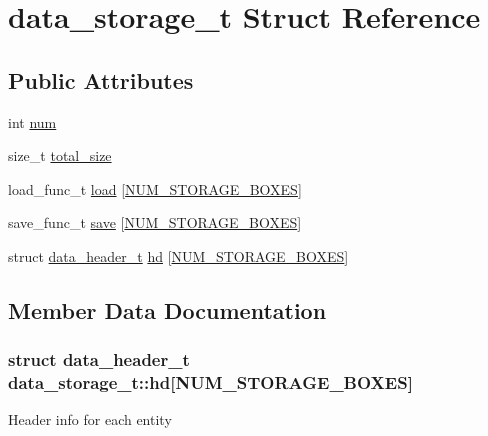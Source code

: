 \hypertarget{structdata__storage__t}{}\section{data\+\_\+storage\+\_\+t Struct Reference}
\label{structdata__storage__t}
\subsection*{Public Attributes}
\begin{DoxyCompactItemize}
\item 
int \hyperlink{structdata__storage__t_ac037eddc51ffd2acc13db6cd92257cc2}{num}
\item 
size\+\_\+t \hyperlink{structdata__storage__t_a0d1c5c0c397a51fff922c8406cff4374}{total\+\_\+size}
\item 
load\+\_\+func\+\_\+t \hyperlink{structdata__storage__t_a99ed11f9a4229d903e7de3eef418fd0a}{load} \mbox{[}\hyperlink{group___storage___manager_gaadd30991320c06b32469d747202380ec}{N\+U\+M\+\_\+\+S\+T\+O\+R\+A\+G\+E\+\_\+\+B\+O\+X\+E\+S}\mbox{]}
\item 
save\+\_\+func\+\_\+t \hyperlink{structdata__storage__t_afd928f17cd46fb954c84d78a0a922e6d}{save} \mbox{[}\hyperlink{group___storage___manager_gaadd30991320c06b32469d747202380ec}{N\+U\+M\+\_\+\+S\+T\+O\+R\+A\+G\+E\+\_\+\+B\+O\+X\+E\+S}\mbox{]}
\item 
struct \hyperlink{structdata__header__t}{data\+\_\+header\+\_\+t} \hyperlink{structdata__storage__t_a97026f3419eea323f2321bbd281ba913}{hd} \mbox{[}\hyperlink{group___storage___manager_gaadd30991320c06b32469d747202380ec}{N\+U\+M\+\_\+\+S\+T\+O\+R\+A\+G\+E\+\_\+\+B\+O\+X\+E\+S}\mbox{]}
\end{DoxyCompactItemize}


\subsection{Member Data Documentation}
\hypertarget{structdata__storage__t_a97026f3419eea323f2321bbd281ba913}{}
\subsubsection[{hd}]{\setlength{\rightskip}{0pt plus 5cm}struct {\bf data\+\_\+header\+\_\+t} data\+\_\+storage\+\_\+t\+::hd\mbox{[}{\bf N\+U\+M\+\_\+\+S\+T\+O\+R\+A\+G\+E\+\_\+\+B\+O\+X\+E\+S}\mbox{]}}\label{structdata__storage__t_a97026f3419eea323f2321bbd281ba913}
Header info for each entity \hypertarget{structdata__storage__t_a99ed11f9a4229d903e7de3eef418fd0a}{}
